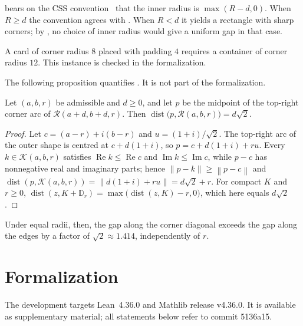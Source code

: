 \documentclass[a4paper,UKenglish,cleveref,autoref,thm-restate]{lipics-v2021}
\newcommand{\Disc}{\mathbb{D}}
\newcommand{\RR}{\mathcal{R}}
\newcommand{\Core}{\mathcal{K}}
\newcommand{\norm}[1]{\left\lVert #1 \right\rVert}
\DeclareMathOperator{\dist}{dist}
\DeclareMathOperator{\ReOp}{Re}
\DeclareMathOperator{\ImOp}{Im}
\newcommand{\lean}[1]{{\leanfont #1}}
\begin{document}
\begin{remark}
 bears on the CSS convention~\cite{css3backgrounds} that the inner radius is
$\max(R - d, 0)$. When $R \ge d$ the convention agrees with . When $R < d$ it
yields a rectangle with sharp corners; by , no choice of inner radius would give a
uniform gap in that case.
\end{remark}

\begin{example}\label{ex:card}
A card of corner radius $8$ placed with padding $4$ requires a container of corner radius $12$.
This instance is checked in the formalization.
\end{example}

The following proposition quantifies . It is not part of the formalization.

\begin{proposition}\label{prop:swell}
Let $(a, b, r)$ be admissible and $d \ge 0$, and let $p$ be the midpoint of the top-right corner
arc of $\RR(a + d, b + d, r)$. Then $\dist\bigl(p, \RR(a, b, r)\bigr) = d\sqrt{2}$.
\end{proposition}

\begin{proof}
Let $c = (a - r) + i(b - r)$ and $u = (1 + i)/\sqrt{2}$. The top-right arc of the outer shape is
centred at $c + d(1 + i)$, so $p = c + d(1 + i) + ru$. Every $k \in \Core(a, b, r)$ satisfies
$\ReOp k \le \ReOp c$ and $\ImOp k \le \ImOp c$, while $p - c$ has nonnegative real and imaginary
parts; hence $\norm{p - k} \ge \norm{p - c}$ and
$\dist(p, \Core(a, b, r)) = \norm{d(1 + i) + ru} = d\sqrt{2} + r$. For compact $K$ and $r \ge 0$,
$\dist(z, K + \Disc_r) = \max\bigl(\dist(z, K) - r, 0\bigr)$, which here equals $d\sqrt{2}$.
\end{proof}

Under equal radii, then, the gap along the corner diagonal exceeds the gap along the edges by a
factor of $\sqrt{2} \approx 1.414$, independently of $r$.

\section{Formalization}\label{sec:lean}

The development targets Lean~4.36.0 and Mathlib release \lean{v4.36.0}. It is available as
supplementary material; all statements below refer to commit \lean{5136a15}.
\end{document}
